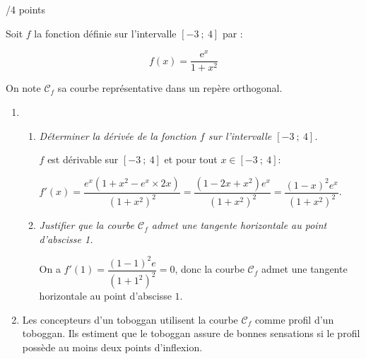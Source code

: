 \documentclass[a4paper]{article}
\begin{document}
\pagebreak

\begin{exerciceinterro}{\hspace{2cm}/4 points}{}



\medskip 

Soit $f$ la fonction définie sur l'intervalle $[-3~;~4]$ par :

\[f(x) = \dfrac{\text{e}^x}{1 + x^2}\]

On note $\mathcal{C}_f$ sa courbe représentative dans un repère orthogonal.

\medskip

\begin{enumerate}
\item 
	\begin{enumerate}
		\item \textit{Déterminer la dérivée de la fonction $f$ sur l'intervalle $[-3~;~4]$.}
		
		$f$ est dérivable sur $[-3~;~4]$ et pour tout $x\in[-3~;~4]$:
		
		$f'(x)=\dfrac{e^x(1+x^2-e^x\times 2x)}{(1+x^2)^2}=\dfrac{(1-2x+x^2)e^x}{(1+x^2)^2}=\dfrac{(1-x)^2e^x}{(1+x^2)^2}$.
		\item \textit{Justifier que la courbe $\mathcal{C}_f$ admet une tangente horizontale au point d'abscisse 1.}
		
		On a $f'(1)=\dfrac{(1-1)^2e}{(1+1^2)^2}=0$, donc la courbe $\mathcal{C}_f$ admet une tangente horizontale au point d'abscisse $1$.

	\end{enumerate}
\item  Les concepteurs d'un toboggan utilisent la courbe $\mathcal{C}_f$ comme profil d'un toboggan. Ils estiment que le toboggan assure de bonnes sensations si le profil possède au moins deux points d'inflexion.

\medskip


\end{enumerate}
\end{exerciceinterro}
\end{document}
